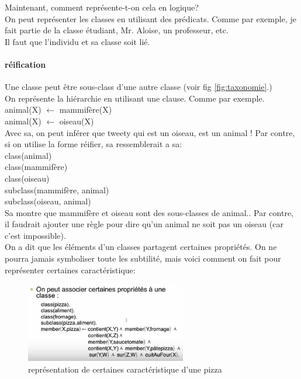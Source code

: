 \documentclass[oneside]{book}
\begin{document}
Maintenant, comment représente-t-on cela en logique? \\

On peut représenter les classes en utilisant des prédicats. Comme par exemple, je fait partie de la classe étudiant, Mr. Aloise, un professeur, etc. \\

Il faut que l'individu et sa classe soit lié. 
\paragraph{réification}
Une classe peut être sous-class d'une autre classe (voir fig \ref{fig:taxonomie}.)\\

On représente la hiérarchie en utilisant une clause. Comme par exemple. \\
animal(X) $\leftarrow$ mammifère(X)\\
animal(X) $\leftarrow$ oiseau(X)\\

Avec sa, on peut inférer que tweety qui est un oiseau, est un animal ! Par contre, si on utilise la forme réifier, sa ressemblerait a sa:\\

class(animal)\\
class(mammifère)\\
class(oiseau)\\
subclass(mammifère, animal)\\
subclass(oiseau, animal)\\

Sa montre que mammifère et oiseau sont des sous-classes de animal.. Par contre, il faudrait ajouter une règle pour dire qu'un animal ne soit pas un oiseau (car c'est impossible). \\

On a dit que les éléments d'un classes partagent certaines propriétés. On ne pourra jamais symboliser toute les subtilité, mais voici comment on fait pour représenter certaines caractéristique:\\

\begin{figure}[!ht]
\centering
\includegraphics[width=7cm, keepaspectratio]{caracteristique.png}
\caption{représentation de certaines caractéristique d'une pizza}
\label{fig:caracteristique}
\end{figure}
\end{document}
